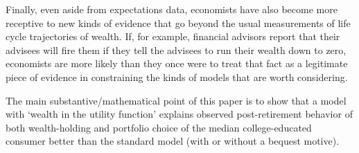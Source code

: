 \documentclass{article}
\begin{document}
Finally, even aside from expectations data, economists have also become more receptive to new kinds of evidence that go beyond the usual measurements of life cycle trajectories of wealth.  If, for example, financial advisors report that their advisees will fire them if they tell the advisees to run their wealth down to zero, economists are more likely than they once were to treat that fact as a legitimate piece of evidence in constraining the kinds of models that are worth considering.




The main substantive/mathematical point of this paper is to show that a model with `wealth in the utility function' explains observed post-retirement behavior of both wealth-holding and portfolio choice of the median college-educated consumer better than the standard model (with or without a bequest motive).


\end{document}
